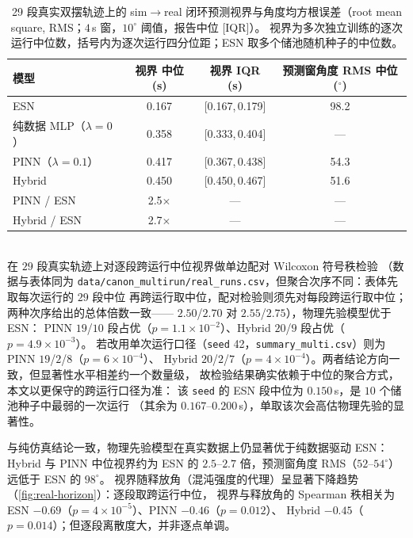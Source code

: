 \documentclass[a4paper,12pt]{ctexart}   %
\renewcommand{\emph}[1]{#1}
\begin{document}
\begin{table}[h]
\centering
\caption{29 段真实双摆轨迹上的 sim$\to$real 闭环预测视界与角度均方根误差（root mean square, RMS；$4$\,s 窗，$10^\circ$ 阈值，报告中位 [IQR]）。
视界为多次独立训练的逐次运行中位数，括号内为逐次运行四分位距；ESN 取多个储池随机种子的中位数。}
\label{tab:real-horizon}
\begin{tabular}{lccc}
\toprule
模型 & 视界 中位 (s) & 视界 IQR (s) & 预测窗角度 RMS 中位 ($^\circ$) \\
\midrule
ESN              & 0.167 & [0.167,\,0.179] & 98.2 \\
纯数据 MLP（$\lambda{=}0$） & 0.358 & [0.333,\,0.404] & --- \\
PINN（$\lambda{=}0.1$）     & 0.417 & [0.367,\,0.438] & 54.3 \\
Hybrid           & 0.450 & [0.450,\,0.467] & 51.6 \\
\midrule
PINN / ESN   & 2.5$\times$ & --- & --- \\
Hybrid / ESN & 2.7$\times$ & --- & --- \\
\bottomrule
\end{tabular}
\\[0.6em]
{\footnotesize 在 $29$ 段真实轨迹上对\emph{逐段跨运行中位}视界做单边配对 Wilcoxon 符号秩检验
（数据与表体同为 \texttt{data/canon\_multirun/real\_runs.csv}，但聚合次序不同：表体先取每次运行的 $29$ 段中位
再跨运行取中位，配对检验则须先对每段跨运行取中位；两种次序给出的总体倍数一致——
$2.50$/$2.70$ 对 $2.55$/$2.75$），物理先验模型优于 ESN：
PINN $19$/$10$ 段占优（$p = 1.1\times10^{-2}$）、Hybrid $20$/$9$ 段占优（$p = 4.9\times10^{-3}$）。
若改用单次运行口径（\texttt{seed} 42，\texttt{summary\_multi.csv}）则为 PINN $19$/$2$/$8$（$p = 6\times10^{-4}$）、
Hybrid $20$/$2$/$7$（$p = 4\times10^{-4}$）。两者结论方向一致，但显著性水平相差约一个数量级，
故检验结果确实依赖于中位的聚合方式，本文以更保守的跨运行口径为准：
该 \texttt{seed} 的 ESN 段中位为 $0.150$\,s，是 $10$ 个储池种子中最弱的一次运行
（其余为 $0.167$--$0.200$\,s），单取该次会高估物理先验的显著性。}
\end{table}

\noindent 与纯仿真结论一致，物理先验模型在真实数据上仍显著优于纯数据驱动 ESN：
Hybrid 与 PINN 中位视界约为 ESN 的 $2.5\text{--}2.7$ 倍，预测窗角度 RMS（$52$--$54^\circ$）远低于 ESN 的 $98^\circ$。
视界随释放角（混沌强度的代理）呈显著下降趋势（\cref{fig:real-horizon}）：逐段取跨运行中位，
视界与释放角的 Spearman 秩相关为 ESN $-0.69$（$p = 4\times10^{-5}$）、PINN $-0.46$（$p = 0.012$）、
Hybrid $-0.45$（$p = 0.014$）；但逐段离散度大，并非逐点单调。
\end{document}
